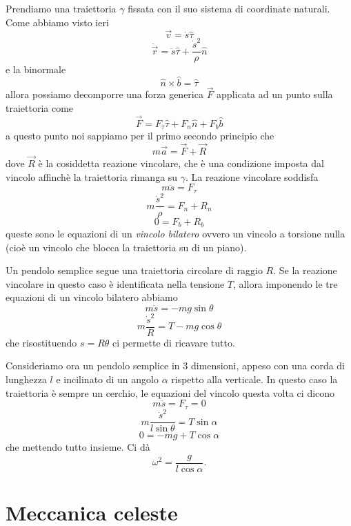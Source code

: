 \documentclass[11pt]{scrartcl}
\newcommand{\accel}{\ddot{\vec{r}}}
\begin{document}
	Prendiamo una traiettoria $\gamma$ fissata con il suo sistema di coordinate naturali. Come abbiamo visto ieri
	$$\vec{v}=\dot{s}\hat{\tau}$$
	$$\accel=\ddot{s}\hat{\tau}+\frac{\dot{s}^2}{\rho}\hat{n}$$
	e la binormale
	$$\hat{n}\times \hat{b}=\hat{\tau}$$
	allora possiamo decomporre una forza generica $\vec{F}$ applicata ad un punto sulla traiettoria come
	$$\vec{F}=F_\tau \hat{\tau}+F_n \hat{n}+F_b \hat{b}$$
	a questo punto noi sappiamo per il primo secondo principio che
	$$m\vec{a}=\vec{F}+\vec{R}$$
	dove $\vec{R}$ è la cosiddetta reazione vincolare, che è una condizione imposta dal vincolo affinchè la traiettoria rimanga su $\gamma$. La reazione vincolare soddisfa
	$$m\ddot{s}=F_\tau$$
	$$m\frac{\dot{s}^2}{\rho}=F_n+R_n$$
	$$0=F_b+R_b$$
	queste sono le equazioni di un \textit{vincolo bilatero} ovvero un vincolo a torsione nulla (cioè un vincolo che blocca la traiettoria su di un piano). 
	\begin{example}
		Un pendolo semplice segue una traiettoria circolare di raggio $R$. Se la reazione vincolare in questo caso è identificata nella tensione $T$, allora imponendo le tre equazioni di un vincolo bilatero abbiamo
		$$m\ddot{s}=-mg\sin\theta$$
		$$m\frac{\dot{s}^2}{R}=T-mg\cos\theta$$
		che risostituendo $s=R\theta$ ci permette di ricavare tutto.
	\end{example}
	\begin{example}
		Consideriamo ora un pendolo semplice in $3$ dimensioni, appeso con una corda di lunghezza $l$ e incilinato di un angolo $\alpha$ rispetto alla verticale. In questo caso la traiettoria è sempre un cerchio, le equazioni del vincolo questa volta ci dicono
		$$m\ddot{s}=F_\tau=0$$
		$$m\frac{\dot{s}^2}{l\sin\theta}=T\sin \alpha$$
		$$0=-mg+T\cos\alpha$$
		che mettendo tutto insieme. Ci dà
		$$\omega^2=\frac{g}{l\cos\alpha}.$$
	\end{example}
	
	\newpage
	
	\section{Meccanica celeste}
	
\end{document}
